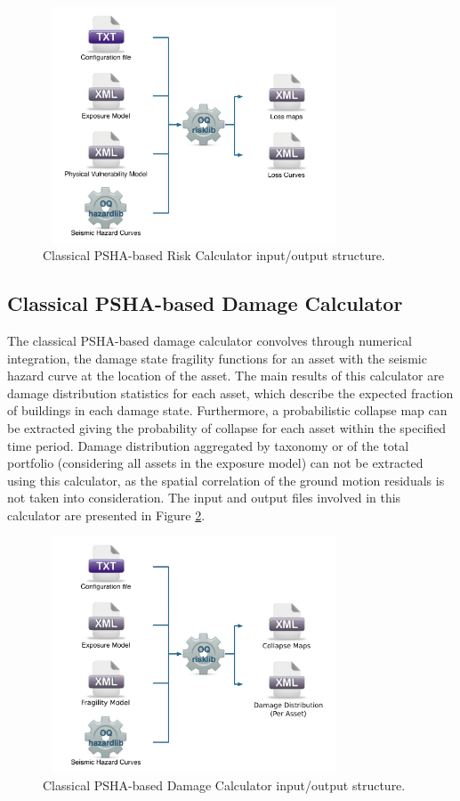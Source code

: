\begin{figure}[ht]
\centering
\includegraphics[width=9cm,height=7cm]{figures/risk/ClassicalRisk.pdf}
\caption{Classical PSHA-based Risk Calculator input/output structure.}
\label{fig:ClassicalRisk}
\end{figure}

\subsection{Classical PSHA-based Damage Calculator}
The classical PSHA-based damage calculator convolves through numerical integration, the damage state fragility functions for an asset with the seismic hazard curve at the location of the asset. The main results of this calculator are damage distribution statistics for each asset, which describe the expected fraction of buildings in each damage state. Furthermore, a probabilistic collapse map can be extracted giving the probability of collapse for each asset within the specified time period. Damage distribution aggregated by taxonomy or of the total portfolio (considering all assets in the exposure model) can not be extracted using this calculator, as the spatial correlation of the ground motion residuals is not taken into consideration. The input and output files involved in this calculator are presented in Figure \ref{fig:ClassicalDamage}.

\begin{figure}[ht]
\centering
\includegraphics[width=9cm,height=7cm]{figures/risk/ClassicalDamage.pdf}
\caption{Classical PSHA-based Damage Calculator input/output structure.}
\label{fig:ClassicalDamage}
\end{figure}

